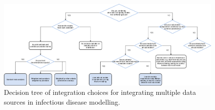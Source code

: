 \documentclass{article}
\begin{document}
\begin{figure}[htbp]
    \centering
    \includegraphics[width=\textwidth]{figures/integration choices decision tree.drawio.png}
    \caption{Decision tree of integration choices for integrating multiple data sources in infectious disease modelling.}
    \label{fig:integration}
\end{figure}
\end{document}
